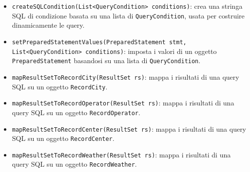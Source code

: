 \begin{itemize}
    \item \texttt{createSQLCondition(List<QueryCondition> conditions)}: crea una stringa SQL di condizione basata su una lista di \texttt{QueryCondition}, usata per costruire dinamicamente le query.
    \item \texttt{setPreparedStatementValues(PreparedStatement stmt, List<QueryCondition> conditions)}: imposta i valori di un oggetto \texttt{PreparedStatement} basandosi su una lista di \texttt{QueryCondition}.
    \item \texttt{mapResultSetToRecordCity(ResultSet rs)}: mappa i risultati di una query SQL su un oggetto \texttt{RecordCity}.
    \item \texttt{mapResultSetToRecordOperator(ResultSet rs)}: mappa i risultati di una query SQL su un oggetto \texttt{RecordOperator}.
    \item \texttt{mapResultSetToRecordCenter(ResultSet rs)}: mappa i risultati di una query SQL su un oggetto \texttt{RecordCenter}.
    \item \texttt{mapResultSetToRecordWeather(ResultSet rs)}: mappa i risultati di una query SQL su un oggetto \texttt{RecordWeather}.
\end{itemize}


